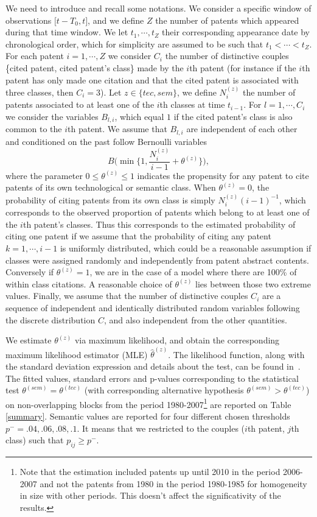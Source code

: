 \documentclass[12pt,twoside,a4paper]{article}
\begin{document}
We need to introduce and recall some notations. We consider a specific window of observations $\big[t- T_0, t \big]$, and we define $Z$ the number of patents which appeared during that time window. We let $t_1, \cdots, t_Z$ their corresponding appearance date by chronological order, which for simplicity are assumed to be such that $t_1 < \cdots < t_Z$. For each patent $i=1, \cdots, Z$ we consider $C_i$ the number of distinctive couples \{cited patent, cited patent's class\} made by the $i$th patent (for instance if the $i$th patent has only made one citation and that the cited patent is associated with three classes, then $C_i = 3$). Let $z \in \{tec, sem\}$, we define $N_{i}^{(z)}$  the number of patents associated to at least one of the $i$th classes at time $t_{i-1}$. For $l = 1, \cdots, C_i$ we consider the variables $B_{l,i}$, which equal $1$ if the cited patent's class is also common to the $i$th patent. We assume that $B_{l,i}$ are independent of each other and conditioned on the past follow Bernoulli variables 
$$B \Big( \min \Big\{ 1, \frac{N_{i}^{(z)}}{i-1} + \theta^{(z)} \Big\} \Big),$$ 
where the parameter $0 \leq \theta^{(z)} \leq 1$ indicates the propensity for any patent to cite patents of its own technological or semantic class. When $\theta^{(z)} = 0$, the probability of citing patents from its own class is simply $N_{i}^{(z)}(i-1)^{-1}$, which corresponds to the observed proportion of patents which belong to at least one of the $i$th patent's classes. Thus this corresponds to the estimated probability of citing one patent if we assume that the probability of citing any patent $k=1, \cdots, i-1$ is uniformly distributed, which could be a reasonable assumption if classes were assigned randomly and independently from patent abstract contents. Conversely if $\theta^{(z)} = 1$, we are in the case of a model where there are 100\% of within class citations. A reasonable choice of $\theta^{(z)}$ lies between those two extreme values. Finally, we assume that the number of distinctive couples $C_i$ are a sequence of independent and identically distributed random variables following the discrete distribution $C$, and also independent from the other quantities.

We estimate $\theta^{(z)}$ via maximum likelihood, and obtain the corresponding maximum likelihood estimator (MLE) $\hat{\theta}^{(z)}$. The likelihood function, along with the standard deviation expression and details about the test, can be found in~. The fitted values, standard errors and p-values corresponding to the statistical test $\theta^{(sem)} = \theta^{(tec)}$ (with corresponding alternative hypothesis $\theta^{(sem)} > \theta^{(tec)}$) on non-overlapping blocks from the period 1980-2007\footnote{Note that the estimation included patents up until 2010 in the period 2006-2007 and not the patents from 1980 in the period 1980-1985 for homogeneity in size with other periods. This doesn't affect the significativity of the results.} are reported on Table \ref{summary}. Semantic values are reported for four different chosen thresholds $p^{-}=.04, .06, .08, .1$. It means that we restricted to the couples ($i$th patent, $j$th class) such that $p_{ij} \geq p^{-}$. 
\end{document}

